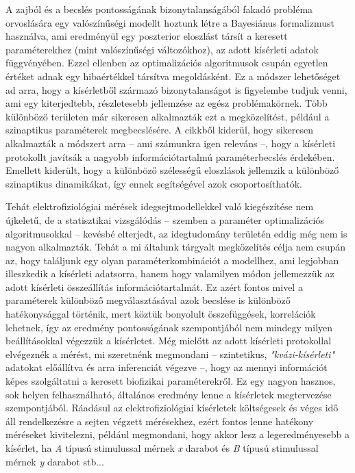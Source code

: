 A zajból és a becslés pontosságának bizonytalanságából fakadó probléma orvoslására egy valószínűségi modellt hoztunk létre a Bayesiánus formalizmust használva, ami eredményül egy poszterior eloszlást társít a keresett paraméterekhez (mint valószínűségi változókhoz), az adott kísérleti adatok függvényében. Ezzel ellenben az optimalizációs algoritmusok csupán egyetlen értéket adnak egy hibaértékkel társítva megoldásként. Ez a módszer lehetőséget ad arra, hogy a kísérletből származó bizonytalanságot is figyelembe tudjuk venni, ami egy kiterjedtebb, részletesebb jellemzése az egész problémakörnek. Több különböző területen már sikeresen alkalmazták ezt a megközelítést, például a szinaptikus paraméterek megbecslésére\cite{costa2013probabilistic}. A cikkből kiderül, hogy sikeresen alkalmazták a módszert arra -- ami számunkra igen releváns --, hogy a kísérleti protokollt javítsák a nagyobb információtartalmú paraméterbecslés érdekében. Emellett kiderült, hogy a különböző szélességű eloszlások jellemzik a különböző szinaptikus dinamikákat, így ennek segítségével azok csoportosíthatók. 


Tehát elektrofiziológiai mérések idegsejtmodellekkel való kiegészítése nem újkeletű, de a statisztikai vizsgálódás -- szemben a paraméter optimalizációs algoritmusokkal -- kevésbé elterjedt, az idegtudomány területén eddig még nem is nagyon alkalmazták. Tehát a mi általunk tárgyalt megközelítés célja nem csupán az, hogy találjunk egy olyan paraméterkombinációt a modellhez, ami legjobban illeszkedik a kísérleti adatsorra, hanem hogy valamilyen módon jellemezzük az adott kísérleti összeállítás információtartalmát. Ez azért fontos mivel a paraméterek különböző megválasztásával azok becslése is különböző hatékonysággal történik, mert köztük bonyolult összefüggések, korrelációk lehetnek, így az eredmény pontosságának szempontjából nem mindegy milyen beállításokkal végezzük a kísérletet. Még mielőtt az adott kísérleti protokollal elvégeznék a mérést, mi szeretnénk megmondani -- szintetikus, \textit{"kvázi-kísérleti"} adatokat előállítva és arra inferenciát végezve --, hogy az mennyi információt képes szolgáltatni a keresett biofizikai paraméterekről. Ez egy nagyon hasznos, sok helyen felhasználható, általános eredmény lenne a kísérletek megtervezése szempontjából. Ráadásul az elektrofiziológiai kísérletek költségesek és véges idő áll rendelkezésre a sejten végzett mérésekhez, ezért fontos lenne hatékony méréseket kivitelezni, például megmondani, hogy akkor lesz a legeredményesebb a kísérlet, ha \textit{A} típusú stimulussal mérnek \textit{x} darabot és \textit{B} típusú stimulussal mérnek \textit{y} darabot stb...


